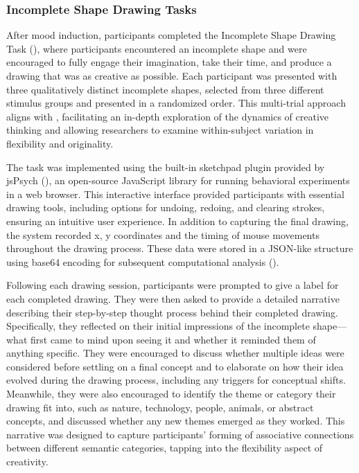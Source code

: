 \documentclass[../MA_Thesis.tex]{subfiles}
\begin{document}
\subsubsection*{Incomplete Shape Drawing Tasks}
After mood induction, participants completed the Incomplete Shape Drawing Task (\cite{barbot_dynamics_2018}), where participants encountered an incomplete shape and were encouraged to fully engage their imagination, take their time, and produce a drawing that was as creative as possible. Each participant was presented with three qualitatively distinct incomplete shapes, selected from three different stimulus groups and presented in a randomized order. This multi-trial approach aligns with \textcite{barbot_dynamics_2018}, facilitating an in-depth exploration of the dynamics of creative thinking and allowing researchers to examine within-subject variation in flexibility and originality. 

The task was implemented using the built-in sketchpad plugin provided by jsPsych (\cite{leeuw_jspsych_2023}), an open-source JavaScript library for running behavioral experiments in a web browser. This interactive interface provided participants with essential drawing tools, including options for undoing, redoing, and clearing strokes, ensuring an intuitive user experience. In addition to capturing the final drawing, the system recorded x, y coordinates and the timing of mouse movements throughout the drawing process. These data were stored in a JSON-like structure using base64 encoding for subsequent computational analysis (\cite{bainbridge_tutorial_2022}).

Following each drawing session, participants were prompted to give a label for each completed drawing. They were then asked to provide a detailed narrative describing their step-by-step thought process behind their completed drawing. Specifically, they reflected on their initial impressions of the incomplete shape—what first came to mind upon seeing it and whether it reminded them of anything specific. They were encouraged to discuss whether multiple ideas were considered before settling on a final concept and to elaborate on how their idea evolved during the drawing process, including any triggers for conceptual shifts. Meanwhile, they were also encouraged to identify the theme or category their drawing fit into, such as nature, technology, people, animals, or abstract concepts, and discussed whether any new themes emerged as they worked. This narrative was designed to capture participants' forming of associative connections between different semantic categories, tapping into the flexibility aspect of creativity. 
\end{document}
